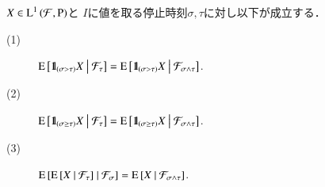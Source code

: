 	\begin{itembox}[l]{}
		\begin{prp}[停止時刻と条件付き期待値]
			$X \in \Lp{1}{\mathcal{F},\operatorname{P}}$と
			$I$に値を取る停止時刻$\sigma, \tau$に対し以下が成立する．
			\begin{description}
				\item[(1)] $\cexp{\defunc_{(\sigma > \tau)} X}{\mathcal{F}_\tau} = \cexp{\defunc_{(\sigma > \tau)} X}{\mathcal{F}_{\sigma \wedge \tau}}$.
				\item[(2)] $\cexp{\defunc_{(\sigma \geq \tau)} X}{\mathcal{F}_\tau} = \cexp{\defunc_{(\sigma \geq \tau)} X}{\mathcal{F}_{\sigma \wedge \tau}}$.
				\item[(3)] $\cexp{\cexp{X}{\mathcal{F}_\tau}}{\mathcal{F}_\sigma} = \cexp{X}{\mathcal{F}_{\sigma \wedge \tau}}$.
			\end{description}
		\end{prp}
	\end{itembox}
	
